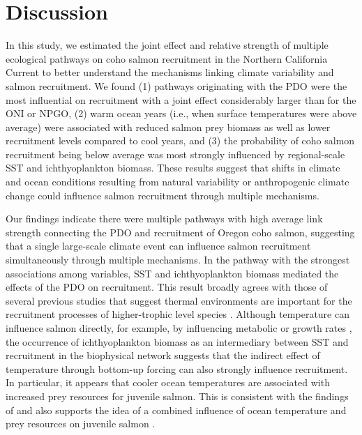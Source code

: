 \section{Discussion}

In this study, we estimated the joint effect and relative strength of multiple
ecological pathways on coho salmon recruitment in the Northern California
Current to better understand the mechanisms linking climate variability and
salmon recruitment. We found (1) pathways originating with the PDO were the most
influential on recruitment with a joint effect considerably larger than for the
ONI or NPGO, (2) warm ocean years (i.e., when surface temperatures were above
average) were associated with reduced salmon prey biomass as well as lower
recruitment levels compared to cool years, and (3) the probability of coho
salmon recruitment being below average was most strongly influenced by
regional-scale SST and ichthyoplankton biomass. These results suggest that
shifts in climate and ocean conditions resulting from natural variability or
anthropogenic climate change could influence salmon recruitment through multiple
mechanisms.

Our findings indicate there were multiple pathways with high average link
strength connecting the PDO and recruitment of Oregon coho salmon, suggesting
that a single large-scale climate event can influence salmon recruitment
simultaneously through multiple mechanisms. In the pathway with the strongest
associations among variables, SST and ichthyoplankton biomass mediated the
effects of the PDO on recruitment. This result broadly agrees with those of
several previous studies that suggest thermal environments are important for the
recruitment processes of higher-trophic level species \citep{Martins2012,
Planque1999, Hunt2011a}. Although temperature can influence salmon directly, for
example, by influencing metabolic or growth rates \citep{Mortensen2000a,
Farley2007b}, the occurrence of ichthyoplankton biomass as an intermediary
between SST and recruitment in the biophysical network suggests that the
indirect effect of temperature through bottom-up forcing can also strongly
influence recruitment. In particular, it appears that cooler ocean temperatures
are associated with increased prey resources for juvenile salmon. This is
consistent with the findings of \citet{Daly2013} and also supports the idea of a
combined influence of ocean temperature and prey resources on juvenile salmon
\citep{Pearcy1992a}.

